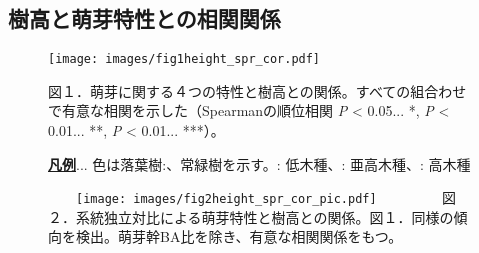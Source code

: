 \documentclass[a0, 30pt, plainboxedsections]{sciposter} %
\begin{document}
\begin{multicols}{2}
\begin{mdframed}[style=subsection.frame,frametitle=\textbf{\color{Black1}{\LARGE{\ding{193}}\Large{樹高が高くなるほど萌芽性が強くなる}}}]
\subsection*{樹高と萌芽特性との相関関係}


\begin{figure}
	\centering
		\texttt{[image: images/fig1height\_spr\_cor.pdf]} %
		
	{\tiny 図１．萌芽に関する４つの特性と樹高との関係。すべての組合わせで有意な相関を示した（Spearmanの順位相関 \textit{P} < 0.05... *, \textit{P} < 0.01... **, \textit{P} < 0.01... ***）。
   
   \textbf{\underline{凡例}}... 色は\textcolor{Orange1}{落葉樹}:、\textcolor{Blue1}{常緑樹}を示す。: 低木種、: 亜高木種、: 高木種}
\end{figure}

\begin{figure}
	\centering\hspace{-2em}
	　　\texttt{[image: images/fig2height\_spr\_cor\_pic.pdf]}
	　　
	　　{\tiny 図２．系統独立対比による萌芽特性と樹高との関係。図１．同様の傾向を検出。萌芽幹BA比を除き、有意な相関関係をもつ。}
\end{figure}

\end{mdframed}

\end{multicols}

\end{document}
